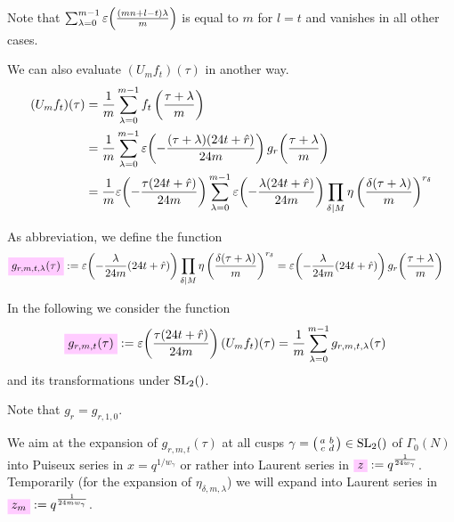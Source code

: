 \documentclass{article}
\begin{document}
Note that
$\sum_{\lambda=0}^{m-1}\varepsilon\!\left(\frac{(mn+l-t)\lambda}{m}\right)$ is
equal to $m$ for $l=t$ and vanishes in all other cases.

We can also evaluate $(U_mf_t)(\tau)$ in another way.
%
\begin{align*}
  (U_mf_t)(\tau)
  &=
  \frac{1}{m} \sum_{\lambda=0}^{m-1}f_t\left(\frac{\tau+\lambda}{m}\right)\\
  &=
    \frac{1}{m} \sum_{\lambda=0}^{m-1}
    \varepsilon\!\left(-\frac{(\tau+\lambda) (24 t + \hat{r})}{24 m}\right)
    g_r\!\left(\frac{\tau+\lambda}{m}\right)
  \\
  &=
  \frac{1}{m}
  \varepsilon\!\left(-\frac{\tau (24t+\hat{r})}{24m}\right)
  \sum_{\lambda=0}^{m-1}
  \varepsilon\!\left(-\frac{\lambda (24t+\hat{r})}{24m}\right)
  \prod_{\delta \mid M}
    \eta\left(\frac{\delta(\tau+\lambda)}{m}\right)^{r_\delta}
\end{align*}

As abbreviation, we define the function
\begin{align}
  \defineNotation[g-r-m-t-lambda-tau]{g_{r,m,t,\lambda}(\tau)}
  &:=
  \unityPower{-\frac{\lambda}{24m} (24t+\sumdelta{r})}
  \divisorprod{M}
  \eta\left(\frac{\delta(\tau+\lambda)}{m}\right)^{r_\delta}
  =
  \unityPower{-\frac{\lambda}{24m} (24t+\sumdelta{r})}
  g_r\!\left(\frac{\tau+\lambda}{m}\right)
  \label{eq:g_r-m-t-lambda(tau)}
\end{align}

In the following we consider the function
\begin{align}
  \defineNotation[g-r-m-t-tau]{g_{r,m,t}(\tau)}
  &:= \unityPower{\frac{\tau (24t+\sumdelta{r})}{24m} } (U_mf_t)(\tau)
  =
  \frac{1}{m} \sum_{\lambda=0}^{m-1} g_{r,m,t,\lambda}(\tau)
  \label{eq:g_r-m-t(tau)}
\end{align}
and its transformations under $\SL2Z$.

Note that $g_r = g_{r, 1, 0}$.

We aim at the expansion of $g_{r,m,t}(\tau)$ at all cusps
$\gamma = \left(
  \begin{smallmatrix}a&b\\c&d\end{smallmatrix} \right)\in \SL2Z$
of $\Gamma_0(N)$ into Puiseux series in $x=q^{1/w_\gamma}$ or rather
into Laurent series in
$\defineNotation[z]{z} := q^{\frac{1}{24 w_\gamma}}$. Temporarily (for
the expansion of $\eta_{\delta,m,\lambda}$) we will expand into
Laurent series in
$\defineNotation[z-m]{z_m} := q^{\frac{1}{24 m w_\gamma}}$.
\end{document}
